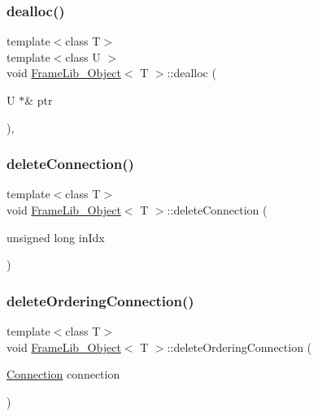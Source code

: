 \mbox{\label{class_frame_lib___object_ab42be79621db7363ca4a34f63704d04f}} 
\subsubsection{\texorpdfstring{dealloc()}{dealloc()}}
{\footnotesize\ttfamily template$<$class T$>$ \\
template$<$class U $>$ \\
void \hyperlink{class_frame_lib___object}{Frame\+Lib\+\_\+\+Object}$<$ T $>$\+::dealloc (\begin{DoxyParamCaption}\item[{U $\ast$\&}]{ptr }\end{DoxyParamCaption})\hspace{0.3cm}{\ttfamily [inline]}, {\ttfamily [protected]}}

\mbox{\label{class_frame_lib___object_aa7dbc1735ebd68008abd939d50edce49}} 
\subsubsection{\texorpdfstring{delete\+Connection()}{deleteConnection()}}
{\footnotesize\ttfamily template$<$class T$>$ \\
void \hyperlink{class_frame_lib___object}{Frame\+Lib\+\_\+\+Object}$<$ T $>$\+::delete\+Connection (\begin{DoxyParamCaption}\item[{unsigned long}]{in\+Idx }\end{DoxyParamCaption})\hspace{0.3cm}{\ttfamily [inline]}}

\mbox{\label{class_frame_lib___object_ab2951a9798e792517aac61ba27553159}} 
\subsubsection{\texorpdfstring{delete\+Ordering\+Connection()}{deleteOrderingConnection()}}
{\footnotesize\ttfamily template$<$class T$>$ \\
void \hyperlink{class_frame_lib___object}{Frame\+Lib\+\_\+\+Object}$<$ T $>$\+::delete\+Ordering\+Connection (\begin{DoxyParamCaption}\item[{\hyperlink{struct_frame_lib___object_1_1_connection}{Connection}}]{connection }\end{DoxyParamCaption})\hspace{0.3cm}{\ttfamily [inline]}}

